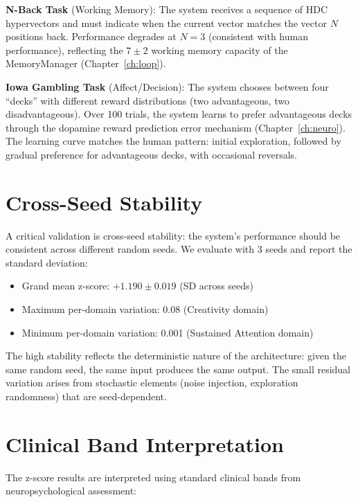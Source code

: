 \documentclass[12pt]{book}
\begin{document}
\textbf{N-Back Task} (Working Memory): The system receives a sequence of HDC hypervectors and must indicate when the current vector matches the vector $N$ positions back. Performance degrades at $N = 3$ (consistent with human performance), reflecting the $7 \pm 2$ working memory capacity of the MemoryManager (Chapter~\ref{ch:loop}).

\textbf{Iowa Gambling Task} (Affect/Decision): The system chooses between four ``decks'' with different reward distributions (two advantageous, two disadvantageous). Over 100 trials, the system learns to prefer advantageous decks through the dopamine reward prediction error mechanism (Chapter~\ref{ch:neuro}). The learning curve matches the human pattern: initial exploration, followed by gradual preference for advantageous decks, with occasional reversals.

\section{Cross-Seed Stability}

A critical validation is cross-seed stability: the system's performance should be consistent across different random seeds. We evaluate with 3 seeds and report the standard deviation:

\begin{itemize}
  \item Grand mean z-score: $+1.190 \pm 0.019$ (SD across seeds)
  \item Maximum per-domain variation: 0.08 (Creativity domain)
  \item Minimum per-domain variation: 0.001 (Sustained Attention domain)
\end{itemize}

The high stability reflects the deterministic nature of the architecture: given the same random seed, the same input produces the same output. The small residual variation arises from stochastic elements (noise injection, exploration randomness) that are seed-dependent.

\section{Clinical Band Interpretation}

The z-score results are interpreted using standard clinical bands from neuropsychological assessment:
\end{document}
